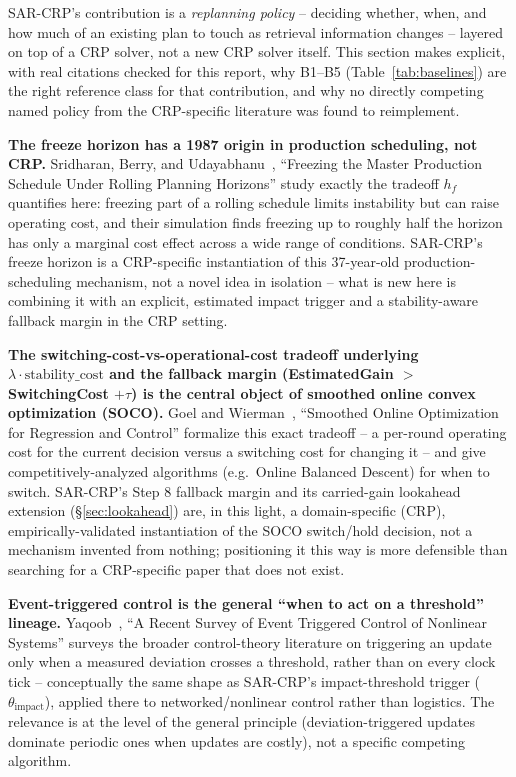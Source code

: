 \documentclass[11pt]{article}
\begin{document}
SAR-CRP's contribution is a \emph{replanning policy} -- deciding whether,
when, and how much of an existing plan to touch as retrieval information
changes -- layered on top of a CRP solver, not a new CRP solver itself.
This section makes explicit, with real citations checked for this report,
why B1--B5 (Table~\ref{tab:baselines}) are the right reference class for
that contribution, and why no directly competing named policy from the
CRP-specific literature was found to reimplement.

\textbf{The freeze horizon has a 1987 origin in production scheduling, not
CRP.} Sridharan, Berry, and Udayabhanu~\cite{sridharan1987}, ``Freezing the Master Production
Schedule Under Rolling Planning Horizons'' study exactly
the tradeoff $h_f$ quantifies here: freezing part of a rolling schedule
limits instability but can raise operating cost, and their simulation
finds freezing up to roughly half the horizon has only a marginal cost
effect across a wide range of conditions. SAR-CRP's freeze horizon is a
CRP-specific instantiation of this 37-year-old production-scheduling
mechanism, not a novel idea in isolation -- what is new here is combining
it with an explicit, estimated impact trigger and a stability-aware
fallback margin in the CRP setting.

\textbf{The switching-cost-vs-operational-cost tradeoff underlying
$\lambda \cdot \text{stability\_cost}$ and the fallback margin
(EstimatedGain $>$ SwitchingCost $+ \tau$) is the central object of
smoothed online convex optimization (SOCO).} Goel and Wierman~\cite{goel2018},
``Smoothed Online Optimization for Regression and Control''
formalize this exact tradeoff -- a per-round
operating cost for the current decision versus a switching cost for
changing it -- and give competitively-analyzed algorithms (e.g.\ Online
Balanced Descent) for when to switch. SAR-CRP's Step 8 fallback margin
and its carried-gain lookahead extension (\S\ref{sec:lookahead}) are, in
this light, a domain-specific (CRP), empirically-validated instantiation
of the SOCO switch/hold decision, not a mechanism invented from nothing;
positioning it this way is more defensible than searching for a
CRP-specific paper that does not exist.

\textbf{Event-triggered control is the general ``when to act on a
threshold'' lineage.} Yaqoob~\cite{yaqoob2022}, ``A Recent Survey of Event Triggered
Control of Nonlinear Systems'' surveys the
broader control-theory literature on triggering an update only when a
measured deviation crosses a threshold, rather than on every clock tick --
conceptually the same shape as SAR-CRP's impact-threshold trigger
($\theta_{\text{impact}}$), applied there to networked/nonlinear control
rather than logistics. The relevance is at the level of the general
principle (deviation-triggered updates dominate periodic ones when
updates are costly), not a specific competing algorithm.
\end{document}
